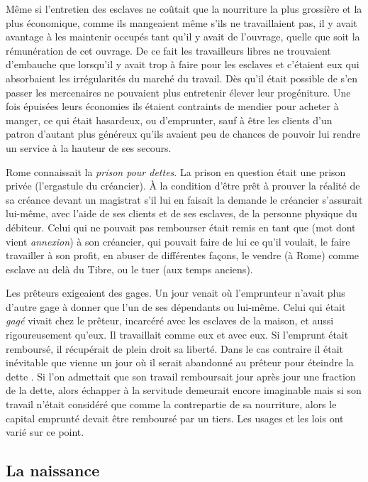 Même si l'entretien des esclaves ne coûtait que la nourriture la
plus grossière et la plus économique, comme ils mangeaient même s'ils
ne travaillaient pas, il y avait avantage à les maintenir occupés tant qu'il y
avait de l'ouvrage, quelle que soit la rémunération de cet ouvrage. De ce
fait les travailleurs libres ne trouvaient d'embauche que lorsqu'il y avait
trop à faire pour les esclaves et c'étaient eux qui absorbaient les irrégularités
du marché du travail. Dès qu'il était possible de s'en passer les mercenaires
ne pouvaient plus entretenir élever leur progéniture. Une fois
épuisées leurs économies ils étaient contraints de mendier pour acheter à
manger, ce qui était hasardeux, ou d'emprunter, sauf à être les clients
d'un patron  d'autant plus généreux qu'ils avaient peu de chances
de pouvoir lui rendre un service à la hauteur de ses secours.

Rome connaissait la \emph{prison pour dettes}. La prison en question était
une prison privée (l'ergastule du créancier). À la condition d'être prêt à
prouver la réalité de sa créance devant un magistrat s'il lui en faisait la
demande le créancier s'assurait lui-même, avec l'aide de ses clients et de
ses esclaves, de la personne physique du débiteur. Celui qui ne pouvait
pas rembourser était remis en tant que  (mot dont vient {\emph{annexion}})
à son créancier, qui pouvait faire de lui ce qu'il voulait, le faire travailler à
son profit, en abuser de différentes façons, le vendre (à Rome) comme
esclave au delà du Tibre, ou le tuer (aux temps anciens).

Les prêteurs exigeaient des gages. Un jour venait où l'emprunteur
n'avait plus d'autre gage à donner que l'un de ses dépendants ou lui-même.
Celui qui était \emph{gagé} vivait chez le prêteur, incarcéré avec les esclaves
de la maison, et aussi rigoureusement qu'eux. Il travaillait comme eux
et avec eux. Si l'emprunt était remboursé, il récupérait de plein droit sa
liberté. Dans le cas contraire il était inévitable que vienne un jour où il
serait abandonné au prêteur pour éteindre la dette . Si l'on admettait
que son travail remboursait jour après jour une fraction de la dette,
alors échapper à la servitude demeurait encore imaginable mais si son
travail n'était considéré que comme la contrepartie de sa nourriture, alors
le capital emprunté devait être remboursé par un tiers. Les usages et les
lois ont varié sur ce point.

\subsection{La naissance}

